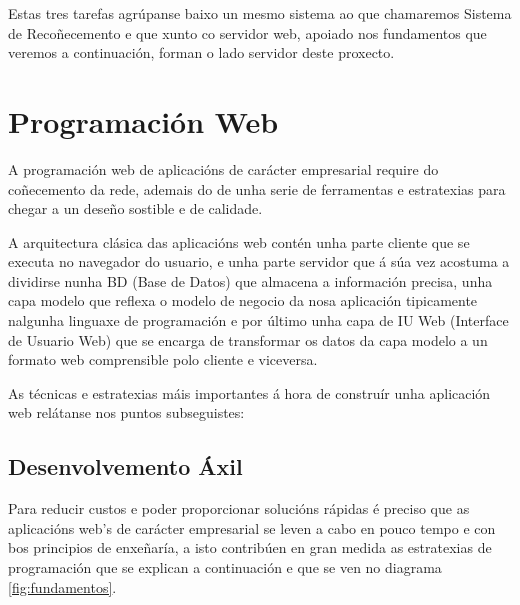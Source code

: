 	Estas tres tarefas agrúpanse baixo un mesmo sistema ao que chamaremos Sistema de Recoñecemento
	e que xunto co servidor web, apoiado nos fundamentos que veremos a continuación, forman o lado
	servidor deste proxecto. 
	
\section{Programación Web}

	A programación web de aplicacións de carácter empresarial require do coñecemento da rede, ademais
	do de unha serie de ferramentas e estratexias para chegar a un deseño sostible e de calidade.
	
	A arquitectura clásica das aplicacións web contén unha parte cliente que se executa no navegador
	do usuario, e unha parte servidor que
	á súa vez acostuma a dividirse nunha BD (Base de Datos) que almacena a información precisa, unha 
	capa modelo que reflexa o modelo de negocio da nosa aplicación tipicamente nalgunha linguaxe 
	de programación e por último unha capa de IU Web (Interface de Usuario Web) que se encarga de 
	transformar os datos da capa modelo a un formato web comprensible polo cliente e viceversa.
	
	As técnicas e estratexias máis importantes á hora de construír unha aplicación web relátanse nos
	puntos subseguistes:
	
	\subsection {Desenvolvemento Áxil}
		Para reducir custos e poder proporcionar solucións rápidas é preciso que as 
		aplicacións web's de carácter empresarial se leven a cabo en pouco tempo e con
		bos principios de enxeñaría, a isto contribúen en gran medida as estratexias de programación 
		que se explican a continuación e que se ven no diagrama \ref{fig:fundamentos}.
	
